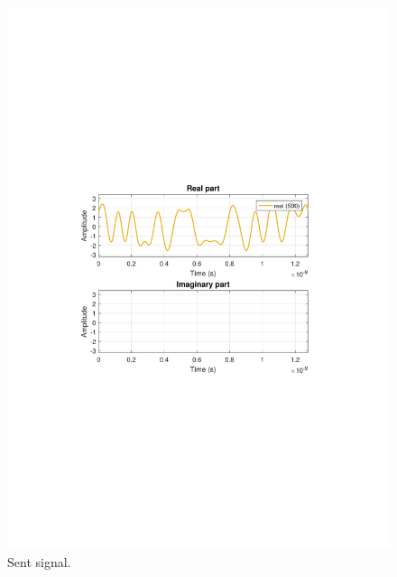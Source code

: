 \documentclass[a4paper]{article}
\begin{document}
\begin{figure}[H]
\centering
\includegraphics[width=\linewidth, trim= 0mm 95mm 0mm 95mm, clip]{sentsignal.pdf}
\caption{Sent signal.}
\label{fig:sentsig}
\end{figure}
\end{document}

